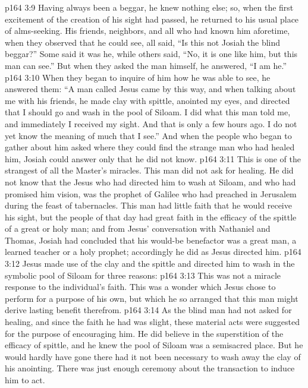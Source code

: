 \vs p164 3:9 Having always been a beggar, he knew nothing else; so, when the first excitement of the creation of his sight had passed, he returned to his usual place of alms\hyp{}seeking. His friends, neighbors, and all who had known him aforetime, when they observed that he could see, all said, “Is this not Josiah the blind beggar?” Some said it was he, while others said, “No, it is one like him, but this man can see.” But when they asked the man himself, he answered, “I am he.”
\vs p164 3:10 When they began to inquire of him how he was able to see, he answered them: “A man called Jesus came by this way, and when talking about me with his friends, he made clay with spittle, anointed my eyes, and directed that I should go and wash in the pool of Siloam. I did what this man told me, and immediately I received my sight. And that is only a few hours ago. I do not yet know the meaning of much that I see.” And when the people who began to gather about him asked where they could find the strange man who had healed him, Josiah could answer only that he did not know.
\pc \vs p164 3:11 This is one of the strangest of all the Master’s miracles. This man did not ask for healing. He did not know that the Jesus who had directed him to wash at Siloam, and who had promised him vision, was the prophet of Galilee who had preached in Jerusalem during the feast of tabernacles. This man had little faith that he would receive his sight, but the people of that day had great faith in the efficacy of the spittle of a great or holy man; and from Jesus’ conversation with Nathaniel and Thomas, Josiah had concluded that his would\hyp{}be benefactor was a great man, a learned teacher or a holy prophet; accordingly he did as Jesus directed him.
\vs p164 3:12 Jesus made use of the clay and the spittle and directed him to wash in the symbolic pool of Siloam for three reasons:
\pc \vs p164 3:13 \bibnobreakspace This was not a miracle response to the individual’s faith. This was a wonder which Jesus chose to perform for a purpose of his own, but which he so arranged that this man might derive lasting benefit therefrom.
\pc \vs p164 3:14 \bibnobreakspace As the blind man had not asked for healing, and since the faith he had was slight, these material acts were suggested for the purpose of encouraging him. He did believe in the superstition of the efficacy of spittle, and he knew the pool of Siloam was a semisacred place. But he would hardly have gone there had it not been necessary to wash away the clay of his anointing. There was just enough ceremony about the transaction to induce him to act.
